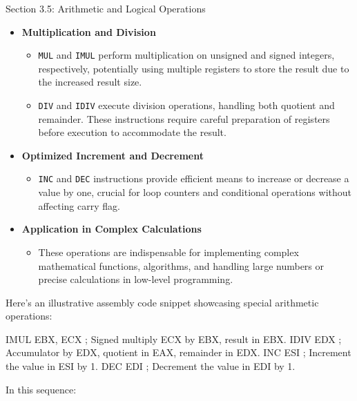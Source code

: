 \begin{notes}{Section 3.5: Arithmetic and Logical Operations}
    \begin{itemize}
        \item \textbf{Multiplication and Division}
        \begin{itemize}
            \item \texttt{MUL} and \texttt{IMUL} perform multiplication on unsigned and signed integers, respectively, potentially using multiple registers to store the result due to the increased result size.
            \item \texttt{DIV} and \texttt{IDIV} execute division operations, handling both quotient and remainder. These instructions require careful preparation of registers before execution to accommodate the result.
        \end{itemize}
        \item \textbf{Optimized Increment and Decrement}
        \begin{itemize}
            \item \texttt{INC} and \texttt{DEC} instructions provide efficient means to increase or decrease a value by one, crucial for loop counters and conditional operations without affecting carry flag.
        \end{itemize}
        \item \textbf{Application in Complex Calculations}
        \begin{itemize}
            \item These operations are indispensable for implementing complex mathematical functions, algorithms, and handling large numbers or precise calculations in low-level programming.
        \end{itemize}
    \end{itemize}
    
    \begin{highlight}
        Here's an illustrative assembly code snippet showcasing special arithmetic operations:
    
    \begin{code}[Assembly]
    IMUL EBX, ECX            ; Signed multiply ECX by EBX, result in EBX.
    IDIV EDX                 ; Accumulator by EDX, quotient in EAX, remainder in EDX.
    INC ESI                  ; Increment the value in ESI by 1.
    DEC EDI                  ; Decrement the value in EDI by 1.
    \end{code}
    
        In this sequence:
    

\end{highlight}
\end{notes}
